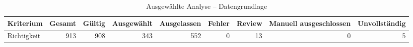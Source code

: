 \begin{table}[htbp]
\centering
\caption{Ausgewählte Analyse -- Datengrundlage}
\begin{tabular}{lrrrrrrrr}
\toprule
Kriterium & Gesamt & Gültig & Ausgewählt & Ausgelassen & Fehler & Review & Manuell ausgeschlossen & Unvollständig \\
\midrule
Richtigkeit & 913 & 908 & 343 & 552 & 0 & 13 & 0 & 5 \\
\bottomrule
\end{tabular}
\end{table}
